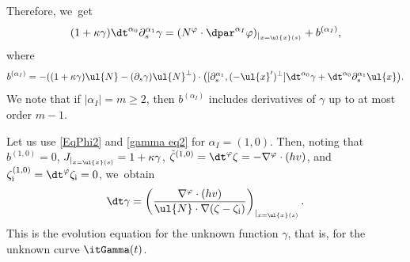 Therefore, we~get
\begin{equation}\label{gamma eq2}
(1+\kappa\gamma)\dt^{\alpha_0}\partial_s^{\alpha_1}\gamma
=(N^\varphi\cdot\dpar^{\alpha_I}\varphi)_{\vert_{x=\ul{x}(s)}} + b^{(\alpha_I)},
\end{equation}
where
\[
b^{(\alpha_I)} = -((1+\kappa\gamma)\ul{N} - (\partial_s\gamma)\ul{N}^\perp)\cdot
\bigl([\partial_s^{\alpha_1},(-\ul{x}')^\perp]\dt^{\alpha_0}\gamma + \dt^{\alpha_0}\partial_s^{\alpha_1}\ul{x} \bigr).
\]
We note that if $|\alpha_I|=m\geq2$, then $b^{(\alpha_I)}$ includes derivatives of $\gamma$ up to at most order $m-1$.

\begin{remark}\label{re:EEg}
Let us use \eqref{EqPhi2} and \eqref{gamma eq2} for $\alpha_I\!=\!(1,0)$.
Then, noting that $b^{(1,0)}\!=\!0$, $J_{\vert_{x=\ul{x}(s)}}=1+\kappa\gamma$, $\check{\zeta}^{(1,0)}=\dt^\varphi\zeta=-\nabla^\varphi\cdot(hv)$, and
$\zeta_\mathrm{i}^{(1,0)}=\dt^\varphi\zeta_\mathrm{i}=0$, we~obtain
\[
\dt\gamma = \left(\frac{\nabla^\varphi\cdot(hv)}{\ul{N}\cdot\nabla(\zeta-\zeta_\mathrm{i})} \right)_{\vert_{x=\ul{x}(s)}}.
\]
This is the evolution equation for the unknown function $\gamma$, that is, for the unknown curve $\itGamma(t)$.
\end{remark}

